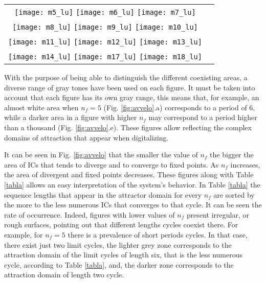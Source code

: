 \begin{figure*}
  \centering
\begin{tabular}{cc}
\texttt{[image: m5\_lu]}
\texttt{[image: m6\_lu]}
\texttt{[image: m7\_lu]}\\
\texttt{[image: m8\_lu]}
\texttt{[image: m9\_lu]}
\texttt{[image: m10\_lu]}\\
\texttt{[image: m11\_lu]}
\texttt{[image: m12\_lu]}
\texttt{[image: m13\_lu]}\\
\texttt{[image: m14\_lu]}
\texttt{[image: m17\_lu]}
\texttt{[image: m18\_lu]}\\
\end{tabular}
\caption{Coexisting areas in attraction domains for: (a) $n_f=5$, (b) $n_f=6$, (c) $n_f=7$, (d) $n_f=8$, (e) $n_f=9$, (f) $n_f=10$, (g) $n_f=11$, (h) $n_f=12$, (i) $n_f=13$, (j) $n_f=14$, (k) $n_f=17$, (l) $n_f=18$.}
\label{fig:avvelo}
\end{figure*}

With the purpose of being able to distinguish the different coexisting areas, a diverse range of gray tones have been used on each figure. It must be taken into account that each figure has its own gray range, this means that, for example, an almost white area when $n_f = 5$ (Fig. \ref{fig:avvelo}.a) corresponds to a period of $6$, while a darker area in a figure with higher $n_f$ may correspond to a period higher than a thousand (Fig. \ref{fig:avvelo}.e). These figures allow reflecting the  complex domains of attraction that appear when digitalizing.

It can be seen in Fig. \ref{fig:avvelo} that the smaller the value of $n_f$ the bigger the area of ICs that tends to diverge and to converge to fixed points. As $n_f$ increases, the area of divergent and fixed points decreases.
These figures along with Table \ref{tabla} allows an easy interpretation of the system's behavior. In Table \ref{tabla} the sequence lengths that appear in the attractor domain for every $n_f$ are sorted by the more to the less numerous ICs that converges to that cycle. It can be seen the rate of occurrence.
Indeed, figures with lower values of $n_f$ present irregular, or rough surfaces, pointing out that different lengths cycles coexist there. For example, for $n_f=5$ there is a prevalence of  short periods cycles. In that case, there exist just two limit cycles, the lighter grey zone corresponds to the attraction domain of the limit cycles of length six, that is the less numerous cycle, according to Table \ref{tabla}, and, the darker zone corresponds to the attraction domain of length two cycle.

